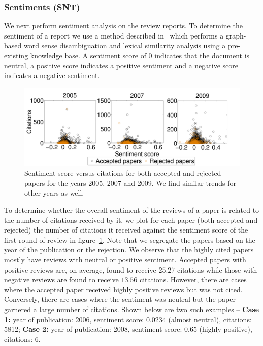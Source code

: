 \subsubsection*{Sentiments (SNT)}
We next perform sentiment analysis on the review reports. To determine the sentiment of a report we use a method described in~\cite{montejo2012random} which performs a graph-based word sense disambiguation and lexical similarity analysis using a pre-existing knowledge base. A sentiment score of 0 indicates that the document is neutral, a positive score  indicates a positive sentiment and a negative score indicates a negative sentiment. 


\begin{figure}[htpb]
\centering
\includegraphics[scale=0.23]{./texfiles/Chapter_4/jcdl/figures/year_sent_cit-eps-converted-to.pdf}
\caption{Sentiment score versus citations for both accepted and rejected papers for the years 2005, 2007 and 2009. We find similar trends for other years as well.}
\label{fig12}
\vspace{3mm}
\end{figure}

To determine whether the overall sentiment of the reviews of a paper is related to the number of citations received by it, we plot for each paper (both accepted and rejected) the number of citations it received against the  sentiment score of the first round of review in figure~\ref{fig12}. Note that we segregate the papers based on the year of the publication or the rejection. We observe that the highly cited papers mostly have reviews with neutral or positive sentiment. Accepted papers with positive reviews are, on average, found to receive $25.27$ citations while those with negative reviews are found to receive $13.56$ citations.
However, there are cases where the accepted paper received highly positive reviews but was not cited. Conversely, there are cases where the sentiment was neutral but the paper garnered a large number of citations. Shown below are two such examples -- {\bf Case 1:} year of publication: 2006, sentiment score: 0.0234 (almost neutral), citations: 5812; {\bf Case 2:} year of publication: 2008, sentiment score: 0.65 (highly positive), citations: 6.


